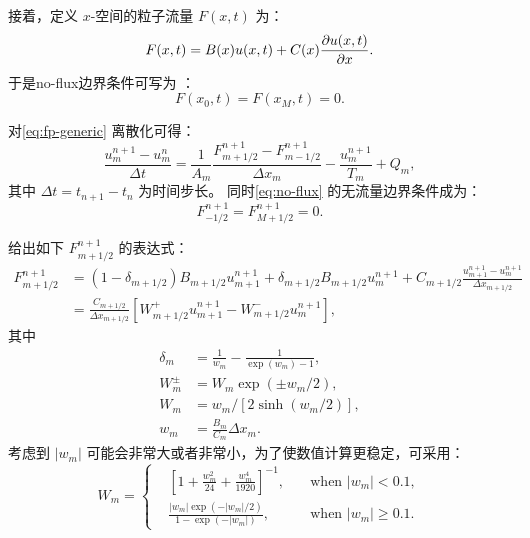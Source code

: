 接着，定义 $x$-空间的粒子流量 $F(x,t)$ 为：
\begin{equation}
  \label{eq:fp-f}
  F(x,t) = B(x) u(x,t) + C(x) \frac{\partial u(x,t)}{\partial x} .
\end{equation}
于是\ac{no-flux}边界条件可写为 \cite{park1995}：
\begin{equation}
  \label{eq:no-flux}
  F(x_0, t) = F(x_M, t) = 0 .
\end{equation}

对\autoref{eq:fp-generic} 离散化可得：
\begin{equation}
  \label{eq:fp-disc}
  \frac{u_m^{n+1} - u_m^n}{\Delta t}
    = \frac{1}{A_m} \frac{F_{m+1/2}^{n+1} - F_{m-1/2}^{n+1}}{\Delta x_m}
      - \frac{u_m^{n+1}}{T_m} + Q_m ,
\end{equation}
其中 $\Delta t = t_{n+1} - t_n$ 为时间步长。
同时\autoref{eq:no-flux} 的无流量边界条件成为：
\begin{equation}
  \label{eq:no-flux-disc}
  F_{-1/2}^{n+1} = F_{M+1/2}^{n+1} = 0 .
\end{equation}

 给出如下 $F_{m+1/2}^{n+1}$ 的表达式：
\begin{align}
  \label{eq:fp-f-chang70}
  F_{m+1/2}^{n+1} & = (1 - \delta_{m+1/2}) B_{m+1/2} u_{m+1}^{n+1}
      + \delta_{m+1/2} B_{m+1/2} u_m^{n+1}
      + C_{m+1/2} \frac{u_{m+1}^{n+1} - u_m^{n+1}}{\Delta x_{m+1/2}} \\
    & = \frac{C_{m+1/2}}{\Delta x_{m+1/2}} \left[
      W_{m+1/2}^{+} u_{m+1}^{n+1} - W_{m+1/2}^{-} u_m^{n+1} \right] ,
\end{align}
其中
\begin{align}
  \delta_m & = \frac{1}{w_m} - \frac{1}{\exp(w_m) - 1} ,
    \label{eq:fp-delta-m} \\
  W_m^{\pm} & = W_m \exp(\pm w_m / 2) ,
    \label{eq:fp-Wm-pm} \\
  W_m & = w_m \big/ [2 \sinh(w_m / 2)] ,
    \label{eq:fp-Wm} \\
  w_m & = \frac{B_m}{C_m} \Delta x_m .
    \label{eq:fp-wm}
\end{align}
考虑到 $|w_m|$ 可能会非常大或者非常小，为了使数值计算更稳定，可采用\cite{park1996}：
\begin{equation}
  \label{eq:fp-Wm-calc}
  W_m = \left\{
    \begin{alignedat}{2}
      & \left[ 1 + \frac{w_m^2}{24} + \frac{w_m^4}{1920} \right]^{-1} ,
        & \quad\text{when~} |w_m| < 0.1 , \\
      & \frac{|w_m| \exp(-|w_m|/2)}{1 - \exp(-|w_m|)} ,
        & \quad\text{when~} |w_m| \ge 0.1 .
    \end{alignedat}
  \right.
\end{equation}

